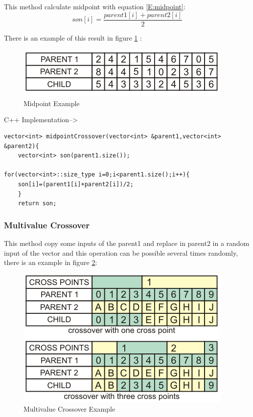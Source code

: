 \documentclass[letterpaper]{article}
\begin{document}
This method calculate midpoint with equation \ref{E:midpoint}:\\

\begin{equation}
son[i]=\frac{parent1[i]+parent2[i]}{2}
\label{E:midpoint}
\end{equation}

There is an example of this result in figure \ref{F:midpoint} :

\begin{figure}[h]
\centering
\includegraphics[width=0.7\linewidth]{images/midpoint.png}
\caption{Midpoint Example}
\label{F:midpoint}
\end{figure}


\bigskip
\bigskip
C++ Implementation-->
\bigskip
\bigskip



\lstset{language=C++}
\begin{lstlisting}
vector<int> midpointCrossover(vector<int> &parent1,vector<int> &parent2){
	vector<int> son(parent1.size());

for(vector<int>::size_type i=0;i<parent1.size();i++){
	son[i]=(parent1[i]+parent2[i])/2;
	}
	return son;
\end{lstlisting}


\subsubsection{Multivalue Crossover}

This method copy some inputs of the parent1 and replace in parent2 in a random input of the vector and this operation can be possible several times randomly, there is an example in figure \ref{F:multivalue}:

\begin{figure}[h]
\centering
\includegraphics[width=0.7\linewidth]{images/multivalue.png}
\caption{Multivalue Crossover Example}
\label{F:multivalue}
\end{figure}
\end{document}
